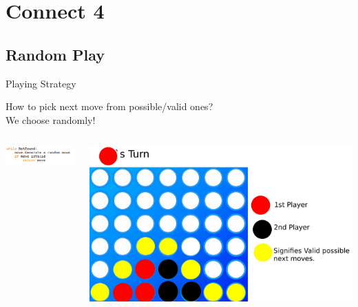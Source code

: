 \documentclass[aspectratio=169]{beamer}
\begin{document}
\section{Connect 4}

\subsection{Random Play}
\begin{frame}{Playing Strategy}

How to pick next move from possible/valid ones? \\
We choose randomly! 
\begin{columns}
	 	\begin{column}{0.5\textwidth}
			\centering
			\includegraphics[scale = .75]{random_algo.png}
	 	\end{column}
 		\begin{column}{0.5\textwidth}
			\centering
			\includegraphics[scale = 0.1]{valid.jpeg}	
	 	\end{column}
	 \end{columns}
\end{frame}
\end{document}
